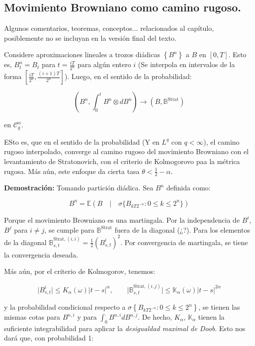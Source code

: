 \subsection{Movimiento Browniano como camino rugoso.}

Algunos comentarios, teoremas, conceptos... relacionados al capítulo, posiblemente no se incluyan en la versión final del texto.

\begin{prop}
	Considere aproximaciones lineales a trozos diádicas $\left\{ B^{n} \right\}$ a $B$ en $[0,T]$. Esto es, $B_t^n = B_t$ para $t = \frac{iT}{2^n}$ para algún entero $i$ (Se interpola en intervalos de la forma $\left[ \frac{iT}{2^n}, \frac{(i+1)T}{2^n} \right]$). Luego, en el sentido de la probabilidad:

	\[
		\left( B^n, \int_0^t B^n \otimes dB^n \right) \rightarrow (B, \mathbb{B}^{\text{Strat}})
	\]

	en $\mathcal{C}^{\alpha}_g$.

\end{prop}

ESto es, que en el sentido de la probabilidad (Y en $L^q$ con $q < \infty$), el camino rugoso interpolado, converge al camino rugoso del movimiento Browniano con el levantamiento de Stratonovich, con el criterio de Kolmogorovo paa la métrica rugosa. Más aún, este enfoque da cierta tasa $\theta < \frac{1}{2} - \alpha$. 
 

\textbf{Demostración:} Tomando partición diádica. Sea $B^n$ definida como:

\[
	B^n = \mathbb{E}(B \quad \vert \quad \sigma\{ B_{kT 2^{-n}}  : 0 \leq k \leq 2^n  \})
\]

Porque el movimiento Browniano es una martingala. Por la independencia de $B^i$, $B^j$ para $i \neq j$, se cumple para $\mathbb{B}^{\text{Strat}}$ fuera de la diagonal (¿?). Para los elementos de la diagonal $\mathbb{B}^{\text{Strat}, (i,i)}_{s,t} = \frac{1}{2} (B_{s,t}^i)^2$. Por convergencia de martingala, se tiene la convergencia deseada.

Más aún, por el criterio de Kolmogorov, tenemos:

\[
	\lvert B^i_{s,t} \rvert \leq K_{\alpha} (\omega) \lvert t - s \rvert^{\alpha}, \qquad \lvert \mathbb{B}_{s,t}^{\text{Strat}, (i,j)} \rvert \leq \mathbb{K}_{\alpha} (\omega) \lvert t - s \rvert^{2\alpha}
\]

y la probabilidad condicional respecto a $\sigma \left\{ B_{kT2^{-n}} : 0 \leq k \leq 2^n \right\}$, se tienen las mismas cotas para $B^{n,i}$ y para $\int_0^{.} B^{n,i} dB^{n,j}$. De hecho, $K_{\alpha}$, $\mathbb{K}_{\alpha}$ tienen la suficiente integrabilidad para aplicar la \textit{desigualdad maximal de Doob}. Esto nos dará que, con probabilidad 1:

